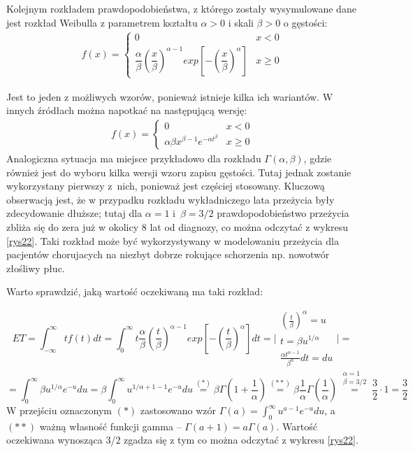 \documentclass[licencjacka]{pwr_wmat_praca_dyplomowa}
\theoremstyle{plain}
\numberwithin{theorem}{chapter}
\theoremstyle{definition}
\numberwithin{theorem}{chapter}
\begin{document}
Kolejnym rozkładem prawdopodobieństwa, z którego zostały wysymulowane dane jest rozkład Weibulla z parametrem kształtu $\alpha>0$ i skali $\beta>0$ o gęstości:
\begin{align}
f(x) = \left\{\begin{array}{ll}0 & x< 0 \\ \dfrac{\alpha}{\beta}\left(\dfrac{x}{\beta}\right)^{\alpha-1}exp \left[ -\left( \dfrac{x}{\beta}\right)^\alpha \right]  & x\geqslant 0 \end{array} \right.
\end{align}


Jest to jeden z możliwych wzorów, ponieważ istnieje kilka ich wariantów. W innych źródłach można napotkać na następującą wersję:
\begin{align}
f(x) = \left\{\begin{array}{ll}0 & x< 0 \\ \alpha \beta x^{\beta-1}e^{-\alpha t^\beta}  & x\geqslant 0 \end{array} \right.
\end{align}
Analogiczna sytuacja ma miejsce przykładowo dla rozkładu $\Gamma(\alpha,\beta)$, gdzie również jest do wyboru kilka wersji wzoru zapisu gęstości. Tutaj jednak zostanie wykorzystany pierwszy z~nich, ponieważ jest częściej stosowany. Kluczową obserwacją jest, że w przypadku rozkładu wykładniczego lata przeżycia były zdecydowanie dłuższe; tutaj dla $\alpha=1$ i~$\beta= 3/2$ prawdopodobieństwo przeżycia zbliża się do zera już w okolicy 8 lat od diagnozy, co można odczytać z wykresu \ref{rys22}. Taki rozkład może być wykorzystywany w modelowaniu przeżycia dla pacjentów chorujacych na niezbyt dobrze rokujące schorzenia np. nowotwór złośliwy płuc.

\newpage Warto sprawdzić, jaką wartość oczekiwaną ma taki rozkład:

$$ET=\int^{\infty}_{-\infty} tf(t)dt=
\int^{\infty}_0 t \dfrac{\alpha}{\beta}\left(\dfrac{t}{\beta}\right)^{\alpha-1}exp \left[ -\left( \dfrac{t}{\beta}\right)^\alpha \right]dt =
\Bigg\vert \substack{\left(\frac{t}{\beta}\right)^\alpha=u \\ t=\beta u^{1/\alpha} \\ \frac{\alpha t^{\alpha-1}}{\beta^\alpha}dt=du}\Bigg\vert =$$
$$ 
=\int^{\infty}_0 \beta u^{1/\alpha} e^{-u}du=
\beta \int^{\infty}_0 u^{1/\alpha+1-1} e^{-u} du \overset{(\ast)}{=}
\beta \Gamma(1+\frac{1}{\alpha})\overset{(\ast \ast)}{=}
\beta \frac{1}{\alpha} \Gamma(\frac{1}{\alpha})
\overset{\substack{\alpha=1 \\ \beta=3/2}}{=}
\frac{3}{2} \cdot 1 = \frac{3}{2}
  $$
W przejściu oznaczonym $(\ast)$ zastosowano wzór  $\Gamma(a)=\int^{\infty}_0 u^{a-1}e^{-u}du$, a $(\ast \ast)$ ważną własność funkcji gamma -- $\Gamma(a+1)=a\Gamma(a)$. Wartość oczekiwana wynosząca 3/2 zgadza się z tym co można odczytać z wykresu \ref{rys22}.
\end{document}

